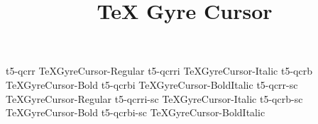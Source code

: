 \documentclass[test]{vnsample}
\title{TeX Gyre Cursor}
\begin{document}
\begin{shortsample}
    {t5-qcrr}     {TeXGyreCursor-Regular}
   {t5-qcrri}    {TeXGyreCursor-Italic}
    {t5-qcrb}     {TeXGyreCursor-Bold}
   {t5-qcrbi}    {TeXGyreCursor-BoldItalic}
   {t5-qcrr-sc}  {TeXGyreCursor-Regular}
 {t5-qcrri-sc} {TeXGyreCursor-Italic}
   {t5-qcrb-sc}  {TeXGyreCursor-Bold}
 {t5-qcrbi-sc} {TeXGyreCursor-BoldItalic}
\end{shortsample}
\end{document}
